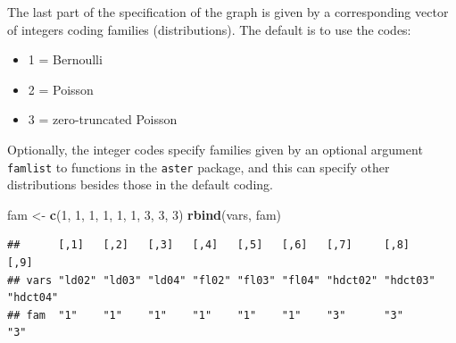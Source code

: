\documentclass[
  ignorenonframetext,
]{beamer}
\newenvironment{Shaded}{\begin{snugshade}}{\end{snugshade}}
\newcommand{\DecValTok}[1]{\textcolor[rgb]{0.00,0.00,0.81}{#1}}
\newcommand{\FunctionTok}[1]{\textcolor[rgb]{0.13,0.29,0.53}{\textbf{#1}}}
\newcommand{\NormalTok}[1]{#1}
\newcommand{\OtherTok}[1]{\textcolor[rgb]{0.56,0.35,0.01}{#1}}
\providecommand{\tightlist}{%
  \setlength{\itemsep}{0pt}\setlength{\parskip}{0pt}}
\begin{document}
\begin{frame}{}
\protect\hypertarget{section-11}{}
The last part of the specification of the graph is given by a
corresponding vector of integers coding families (distributions). The
default is to use the codes:

\begin{itemize}
\tightlist
\item
  1 = Bernoulli
\item
  2 = Poisson
\item
  3 = zero-truncated Poisson
\end{itemize}
\end{frame}

\begin{frame}[fragile]{}
\protect\hypertarget{section-12}{}
Optionally, the integer codes specify families given by an optional
argument \texttt{famlist} to functions in the \texttt{aster} package,
and this can specify other distributions besides those in the default
coding.

\vspace{12pt}
\tiny

\begin{Shaded}
\begin{Highlighting}[]
\NormalTok{fam }\OtherTok{\textless{}{-}} \FunctionTok{c}\NormalTok{(}\DecValTok{1}\NormalTok{, }\DecValTok{1}\NormalTok{, }\DecValTok{1}\NormalTok{, }\DecValTok{1}\NormalTok{, }\DecValTok{1}\NormalTok{, }\DecValTok{1}\NormalTok{, }\DecValTok{3}\NormalTok{, }\DecValTok{3}\NormalTok{, }\DecValTok{3}\NormalTok{)}
\FunctionTok{rbind}\NormalTok{(vars, fam)}
\end{Highlighting}
\end{Shaded}

\begin{verbatim}
##      [,1]   [,2]   [,3]   [,4]   [,5]   [,6]   [,7]     [,8]     [,9]    
## vars "ld02" "ld03" "ld04" "fl02" "fl03" "fl04" "hdct02" "hdct03" "hdct04"
## fam  "1"    "1"    "1"    "1"    "1"    "1"    "3"      "3"      "3"
\end{verbatim}
\end{frame}
\end{document}
